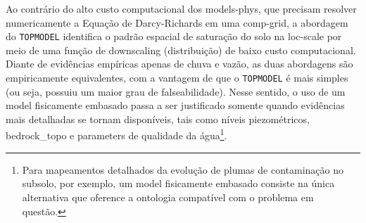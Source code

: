 \documentclass[./main.tex]{subfiles}
\begin{document}
\par Ao contrário do alto custo computacional dos \gls{models-phys}, que precisam resolver numericamente a Equação de Darcy-Richards em uma \gls{comp-grid}, a abordagem do \texttt{TOPMODEL} identifica o padrão espacial de saturação do solo na \gls{loc-scale} por meio de uma função de \gls{downscaling} (distribuição) de baixo custo computacional. Diante de evidências empíricas apenas de chuva e vazão, as duas abordagens são empiricamente equivalentes, com a vantagem de que o \texttt{TOPMODEL} é mais simples (ou seja, possuiu um maior grau de falseabilidade). Nesse sentido, o uso de um \gls{model} fisicamente embasado passa a ser justificado somente quando evidências mais detalhadas se tornam disponíveis, tais como níveis piezométricos, \gls{bedrock_topo} e \gls{parameters} de qualidade da água\footnote{Para mapeamentos detalhados da evolução de plumas de contaminação no subsolo, por exemplo, um \gls{model} fisicamente embasado consiste na única alternativa que oference a ontologia compatível com o problema em questão.}.
\end{document}
